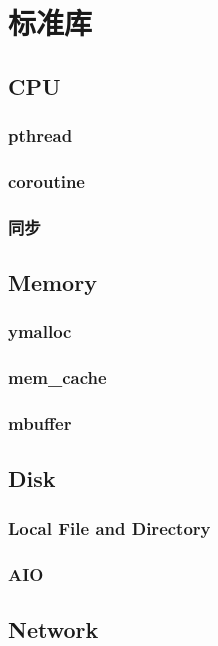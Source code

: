 \chapter{标准库}

\section{CPU}

\subsection{pthread}
\subsection{coroutine}
\subsection{同步}

\section{Memory}

\subsection{ymalloc}
\subsection{mem\_cache}
\subsection{mbuffer}

\section{Disk}

\subsection{Local File and Directory}
\subsection{AIO}

\section{Network}

